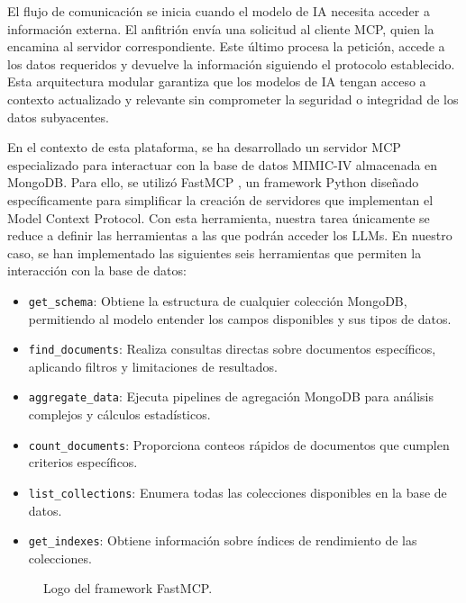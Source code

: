 El flujo de comunicación se inicia cuando el modelo de IA necesita acceder a información externa. El anfitrión envía una solicitud al cliente MCP, quien la encamina al servidor correspondiente. Este último procesa la petición, accede a los datos requeridos y devuelve la información siguiendo el protocolo establecido. Esta arquitectura modular garantiza que los modelos de IA tengan acceso a contexto actualizado y relevante sin comprometer la seguridad o integridad de los datos subyacentes.





En el contexto de esta plataforma, se ha desarrollado un servidor MCP especializado para interactuar con la base de datos MIMIC-IV almacenada en MongoDB. Para ello, se utilizó FastMCP \cite{fastmcp}, un framework Python diseñado específicamente para simplificar la creación de servidores que implementan el Model Context Protocol. Con esta herramienta, nuestra tarea únicamente se reduce a definir las herramientas a las que podrán acceder los LLMs. En nuestro caso, se han implementado las siguientes seis herramientas que permiten la interacción con la base de datos:

\begin{itemize}
\item \texttt{get\_schema}: Obtiene la estructura de cualquier colección MongoDB, permitiendo al modelo entender los campos disponibles y sus tipos de datos.
\item \texttt{find\_documents}: Realiza consultas directas sobre documentos específicos, aplicando filtros y limitaciones de resultados.
\item \texttt{aggregate\_data}: Ejecuta pipelines de agregación MongoDB para análisis complejos y cálculos estadísticos.
\item \texttt{count\_documents}: Proporciona conteos rápidos de documentos que cumplen criterios específicos.
\item \texttt{list\_collections}: Enumera todas las colecciones disponibles en la base de datos.
\item \texttt{get\_indexes}: Obtiene información sobre índices de rendimiento de las colecciones.
\end{itemize}


\begin{figure}[H]
  \centering
  \caption{Logo del framework FastMCP.}
  \label{fig:fastmcp}
\end{figure}



